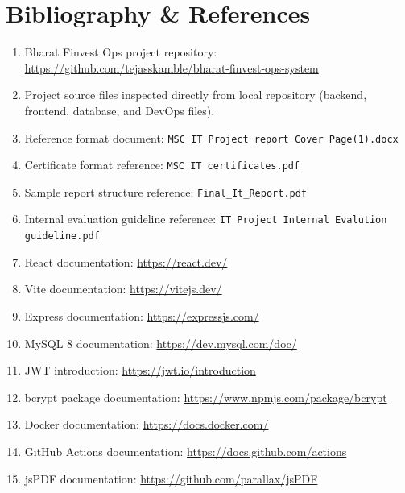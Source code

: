 \chapter{Bibliography \& References}

\begin{enumerate}[leftmargin=1.3cm]
\item Bharat Finvest Ops project repository: \url{https://github.com/tejasskamble/bharat-finvest-ops-system}
\item Project source files inspected directly from local repository (backend, frontend, database, and DevOps files).
\item Reference format document: \texttt{MSC IT Project report Cover Page(1).docx}
\item Certificate format reference: \texttt{MSC IT certificates.pdf}
\item Sample report structure reference: \texttt{Final\_It\_Report.pdf}
\item Internal evaluation guideline reference: \texttt{IT Project Internal Evalution guideline.pdf}
\item React documentation: \url{https://react.dev/}
\item Vite documentation: \url{https://vitejs.dev/}
\item Express documentation: \url{https://expressjs.com/}
\item MySQL 8 documentation: \url{https://dev.mysql.com/doc/}
\item JWT introduction: \url{https://jwt.io/introduction}
\item bcrypt package documentation: \url{https://www.npmjs.com/package/bcrypt}
\item Docker documentation: \url{https://docs.docker.com/}
\item GitHub Actions documentation: \url{https://docs.github.com/actions}
\item jsPDF documentation: \url{https://github.com/parallax/jsPDF}
\end{enumerate}
